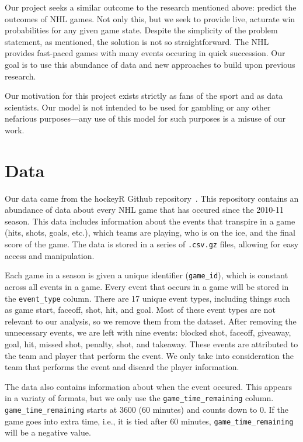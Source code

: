 \documentclass[11pt]{article}
\begin{document}
Our project seeks a similar outcome to the research mentioned above: predict the outcomes of NHL games. Not only this,
but we seek to provide live, acturate win probabilities for any given game state. Despite the simplicity of the problem statement, 
as mentioned, the solution is not so straightforward. The NHL provides fast-paced games with many events
occuring in quick succession. Our goal is to use this abundance of data and new approaches to build upon previous research.

Our motivation for this project exists strictly as fans of the sport and as data scientists. Our model is not intended to be used for gambling or any other
nefarious purposes—any use of this model for such purposes is a misuse of our work.

\section{Data}
Our data came from the hockeyR Github repository~\cite{hockeyR-data}. This repository contains an abundance of data about every NHL game
that has occured since the 2010-11 season. This data includes information about the events that transpire in a game (hits, shots, goals, etc.),
which teams are playing, who is on the ice, and the final score of the game. The data is stored in a series of {\tt .csv.gz} files, allowing for
easy access and manipulation.

Each game in a season is given a unique identifier ({\tt game\_id}), which is constant across all events in a game. Every event that occurs in a game
will be stored in the {\tt event\_type} column. There are 17 unique event types, including things such as game start, faceoff, shot, hit, and goal.
Most of these event types are not relevant to our analysis, so we remove them from the dataset. After removing the unnecessary events, we are left with
nine events: blocked shot, faceoff, giveaway, goal, hit, missed shot, penalty, shot, and takeaway. These events are attributed to the
team and player that perform the event. We only take into consideration the team that performs the event and discard the player information.

The data also contains information about when the event occured. This appears in a variaty of formats, but we only
use the {\tt game\_time\_remaining} column. {\tt game\_time\_remaining} starts
at 3600 (60 minutes) and counts down to 0. If the game goes into extra time, i.e., it is tied after 60 minutes, {\tt game\_time\_remaining} will
be a negative value.
\end{document}
